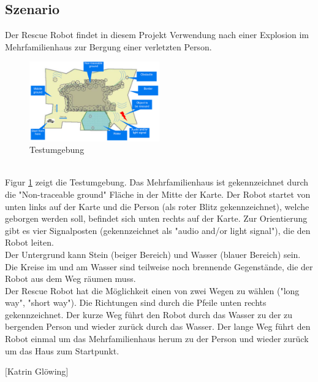 \subsection{Szenario}
\label{subsection:szenario}
Der Rescue Robot findet in diesem Projekt Verwendung nach einer Explosion im Mehrfamilienhaus zur Bergung einer verletzten Person.
\begin{figure}[htbp] 
  \centering
     \includegraphics[width=0.5\textwidth]{Bilder/testumgebung.PNG}
  \caption{Testumgebung}
  \label{fig:testumgebung}
\end{figure}\\
Figur \ref{fig:testumgebung} zeigt die Testumgebung. Das Mehrfamilienhaus ist gekennzeichnet durch die "Non-traceable ground" Fläche in der Mitte der Karte. Der Robot startet von unten links auf der Karte und die Person (als roter Blitz gekennzeichnet), welche geborgen werden soll, befindet sich unten rechts auf der Karte. Zur Orientierung gibt es vier Signalposten (gekennzeichnet als "audio and/or light signal"), die den Robot leiten.\\
Der Untergrund kann Stein (beiger Bereich) und Wasser (blauer Bereich) sein. Die Kreise im und am Wasser sind teilweise noch brennende Gegenstände, die der Robot aus dem Weg räumen muss.\\
Der Rescue Robot hat die Möglichkeit einen von zwei Wegen zu wählen ("long way", "short way"). Die Richtungen sind durch die Pfeile unten rechts gekennzeichnet. Der kurze Weg führt den Robot durch das Wasser zu der zu bergenden Person und wieder zurück durch das Wasser. Der lange Weg führt den Robot einmal um das Mehrfamilienhaus herum zu der Person und wieder zurück um das Haus zum Startpunkt.
\begin{flushright}
	$ [ $Katrin Glöwing$ ] $
\end{flushright}

